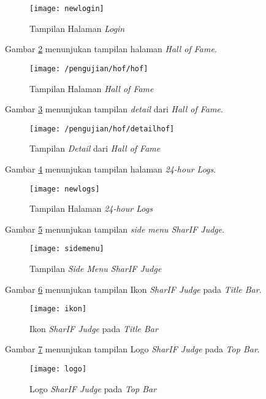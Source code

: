 \begin{enumerate}
	\begin{figure}[H]
		\centering  
		\texttt{[image: newlogin]}  
		\caption[Tampilan Halaman Login]{Tampilan Halaman \textit{Login}} 
		\label{fig:newlogin} 
	\end{figure}

	Gambar \ref{fig:newhof} menunjukan tampilan halaman \textit{Hall of Fame}.
	\begin{figure}[H]
		\centering  
		\texttt{[image: /pengujian/hof/hof]}  
		\caption[Tampilan Halaman Hall of Fame]{Tampilan Halaman \textit{Hall of Fame}} 
		\label{fig:newhof} 
	\end{figure}

	Gambar \ref{fig:newhofdetail} menunjukan tampilan \textit{detail} dari \textit{Hall of Fame}.
	\begin{figure}[H]
		\centering  
		\texttt{[image: /pengujian/hof/detailhof]}  
		\caption[Tampilan Detail dari Hall of Fame]{Tampilan \textit{Detail} dari \textit{Hall of Fame}} 
		\label{fig:newhofdetail} 
	\end{figure}

	Gambar \ref{fig:newlogs} menunjukan tampilan halaman \textit{24-hour Logs}.
	\begin{figure}[H]
		\centering  
		\texttt{[image: newlogs]}  
		\caption[Tampilan Halaman \textit{24-hour Logs}]{Tampilan Halaman \textit{24-hour Logs}} 
		\label{fig:newlogs} 
	\end{figure}
	
	Gambar \ref{fig:sidemenu} menunjukan tampilan \textit{side menu SharIF Judge}.
	\begin{figure}[H]
		\centering  
		\texttt{[image: sidemenu]}  
		\caption[Tampilan\textit{ Side Menu SharIF Judge}]{Tampilan \textit{Side Menu SharIF Judge}} 
		\label{fig:sidemenu} 
	\end{figure}
	
	Gambar \ref{fig:ikons} menunjukan tampilan Ikon \textit{SharIF Judge} pada \textit{Title Bar}.
	\begin{figure}[H]
		\centering  
		\texttt{[image: ikon]}  
		\caption[Ikon \textit{SharIF Judge} pada \textit{Title Bar}]{Ikon \textit{SharIF Judge} pada \textit{Title Bar}} 
		\label{fig:ikons} 
	\end{figure} 
	
	Gambar \ref{fig:logos} menunjukan tampilan Logo \textit{SharIF Judge} pada \textit{Top Bar}.
	\begin{figure}[H]
		\centering  
		\texttt{[image: logo]}  
		\caption[Logo \textit{SharIF Judge} pada \textit{Top Bar}]{Logo \textit{SharIF Judge} pada \textit{Top Bar}} 
		\label{fig:logos} 
	\end{figure} 
\end{enumerate}

